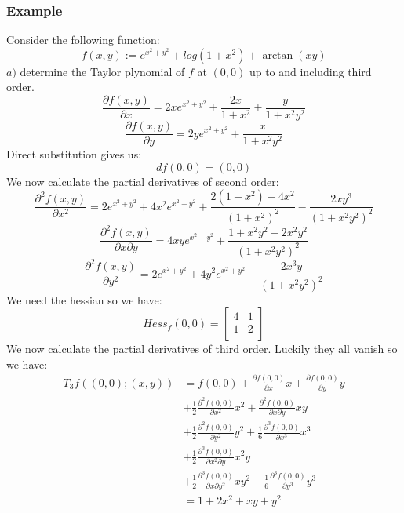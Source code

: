 \documentclass[8pt]{extarticle}
\begin{document}
\begin{multicols*}{3}
\begin{tcolorbox}[colback=blue!5!white,colframe=blue!75!black]
\subsubsection{Example}
Consider the following function:
$$ f(x, y) := e^{x^2 + y^2} + log(1 + x^2) + \arctan(xy)$$
$a)$ determine the Taylor plynomial of $f$ at $(0, 0)$ up to and including third order.
$$\frac{\partial f(x,y)}{\partial x} = 2xe^{x^2 + y^2} + \frac{2x}{1 + x^2} + \frac{y}{1 + x^2y^2}$$
$$\frac{\partial f(x,y)}{\partial y} = 2ye^{x^2 + y^2} + \frac{x}{1 + x^2y^2}$$
Direct substitution gives us:
$$ df(0, 0) = (0, 0)$$
We now calculate the partial derivatives of second order:
$$\frac{\partial^2 f(x,y)}{\partial x^2} = 2e^{x^2+y^2} + 4x^2e^{x^2+y^2} + \frac{2(1 + x^2) - 4x^2}{(1 + x^2)^2} - \frac{2xy^3}{(1 + x^2y^2)^2}$$
$$\frac{\partial^2 f(x,y)}{\partial x \partial y} = 4xye^{x^2+y^2} + \frac{1 + x^2y^2 - 2x^2y^2}{(1 + x^2y^2)^2}$$
$$\frac{\partial^2 f(x,y)}{\partial y^2} = 2e^{x^2+y^2} + 4y^2e^{x^2+y^2} - \frac{2x^3y}{(1 + x^2y^2)^2}$$
We need the hessian so we have:
$$Hess_f(0, 0) =
  \left[ {\begin{array}{cc}
    4 & 1\\
    1 & 2\\
  \end{array} } \right]$$
We now calculate the partial derivatives of third order. Luckily they all vanish so we have:
  \begin{align*}
T_3f((0,0); (x,y)) &= f(0,0) + \frac{\partial f(0,0)}{\partial x}x + \frac{\partial f(0,0)}{\partial y}y  \\
&+\frac{1}{2} \frac{\partial^2 f(0,0)}{\partial x^2}x^2 + \frac{\partial^2 f(0,0)}{\partial x \partial y}xy \\
&+ \frac{1}{2} \frac{\partial^2 f(0,0)}{\partial y^2}y^2 + \frac{1}{6} \frac{\partial^3 f(0,0)}{\partial x^3}x^3 \\
&+ \frac{1}{2} \frac{\partial^3 f(0,0)}{\partial x^2\partial y}x^2y \\
&+\frac{1}{2} \frac{\partial^3 f(0,0)}{\partial x \partial y^2}xy^2 + \frac{1}{6} \frac{\partial^3 f(0,0)}{\partial y^3}y^3 \\
&= 1 + 2x^2 + xy + y^2
\end{align*}
\end{tcolorbox}

\end{multicols*}
\end{document}
